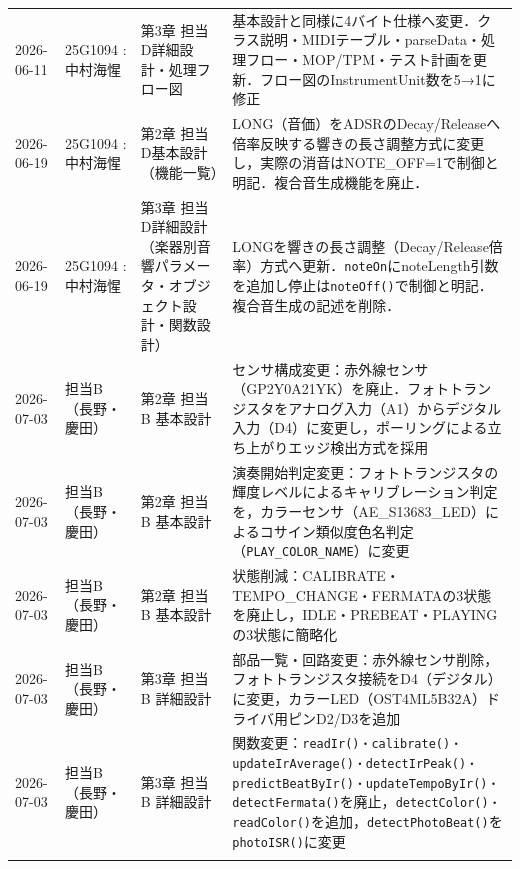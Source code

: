 \begin{longtable}{p{2.2cm}p{3.5cm}p{4cm}p{5.5cm}}
2026-06-11 & 25G1094 : 中村海惺 & 第3章 担当D詳細設計・処理フロー図 & 基本設計と同様に4バイト仕様へ変更．クラス説明・MIDIテーブル・parseData・処理フロー・MOP/TPM・テスト計画を更新．フロー図のInstrumentUnit数を5→1に修正 \\
2026-06-19 & 25G1094 : 中村海惺 & 第2章 担当D基本設計（機能一覧） & LONG（音価）をADSRのDecay/Releaseへ倍率反映する響きの長さ調整方式に変更し，実際の消音はNOTE\_OFF=1で制御と明記．複合音生成機能を廃止．\\
2026-06-19 & 25G1094 : 中村海惺 & 第3章 担当D詳細設計（楽器別音響パラメータ・オブジェクト設計・関数設計） & LONGを響きの長さ調整（Decay/Release倍率）方式へ更新．\texttt{noteOn}にnoteLength引数を追加し停止は\texttt{noteOff()}で制御と明記．複合音生成の記述を削除． \\

2026-07-03 & 担当B（長野・慶田） & 第2章 担当B 基本設計 & センサ構成変更：赤外線センサ（GP2Y0A21YK）を廃止．フォトトランジスタをアナログ入力（A1）からデジタル入力（D4）に変更し，ポーリングによる立ち上がりエッジ検出方式を採用 \\
2026-07-03 & 担当B（長野・慶田） & 第2章 担当B 基本設計 & 演奏開始判定変更：フォトトランジスタの輝度レベルによるキャリブレーション判定を，カラーセンサ（AE\_S13683\_LED）によるコサイン類似度色名判定（\texttt{PLAY\_COLOR\_NAME}）に変更 \\
2026-07-03 & 担当B（長野・慶田） & 第2章 担当B 基本設計 & 状態削減：CALIBRATE・TEMPO\_CHANGE・FERMATAの3状態を廃止し，IDLE・PREBEAT・PLAYINGの3状態に簡略化 \\
2026-07-03 & 担当B（長野・慶田） & 第3章 担当B 詳細設計 & 部品一覧・回路変更：赤外線センサ削除，フォトトランジスタ接続をD4（デジタル）に変更，カラーLED（OST4ML5B32A）ドライバ用ピンD2/D3を追加 \\
2026-07-03 & 担当B（長野・慶田） & 第3章 担当B 詳細設計 & 関数変更：\texttt{readIr()・calibrate()・updateIrAverage()・detectIrPeak()・predictBeatByIr()・updateTempoByIr()・detectFermata()}を廃止，\texttt{detectColor()・readColor()}を追加，\texttt{detectPhotoBeat()}を\texttt{photoISR()}に変更 \\

\bottomrule
\endfoot
\end{longtable}
